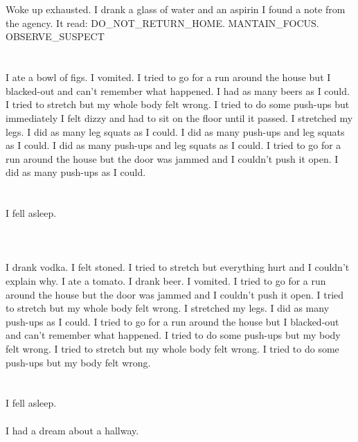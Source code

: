 \documentclass{article}
\begin{document}
    \section{}
    Woke up exhausted. I drank a glass of water and an aspirin I found a note from the agency. It read: DO_NOT_RETURN_HOME. MANTAIN_FOCUS. OBSERVE_SUSPECT  
    \newpage
    
    \section{}
    I ate a bowl of figs. I vomited. I tried to go for a run around the house but I blacked-out and can't remember what happened. I had as many beers as I could.  I tried to stretch but my whole body felt wrong.  I tried to do some push-ups but immediately I felt dizzy and had to sit on the floor until it passed.  I stretched my legs.  I did as many leg squats as I could.   I did as many push-ups and leg squats as I could.  I did as many push-ups and leg squats as I could.  I tried to go for a run around the house but the door was jammed and I couldn't push it open.  I did as many push-ups as I could.  
    \newpage
    
    \section{}
    I fell asleep.\\\\ 
    \newpage
    
    \section{}
    I drank vodka. I felt stoned. I tried to stretch but everything hurt and I couldn't explain why. I ate a tomato. I drank beer. I vomited.  I tried to go for a run around the house but the door was jammed and I couldn't push it open.  I tried to stretch but my whole body felt wrong.  I stretched my legs.  I did as many push-ups as I could.   I tried to go for a run around the house but I blacked-out and can't remember what happened.  I tried to do some push-ups but my body felt wrong.  I tried to stretch but my whole body felt wrong.  I tried to do some push-ups but my body felt wrong.  
    \newpage
    
    \section{}
    I fell asleep.\\\\I had a dream about a hallway.\\\\ 
    \newpage
    
\end{document}
